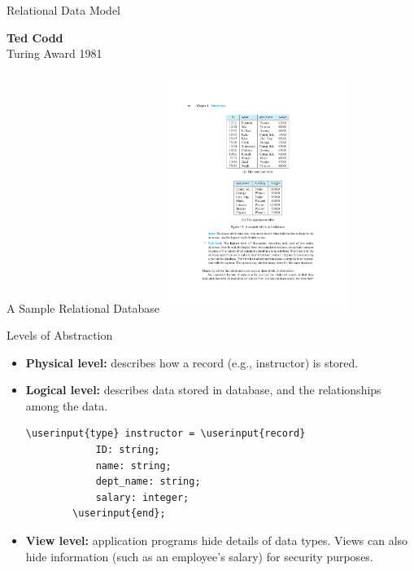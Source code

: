 \documentclass{beamer}
\newcommand\userinput[1]{\textbf{#1}}
\begin{document}
\begin{frame}{Relational Data Model}
\begin{minipage}{0.5\textwidth}
        \textbf{Ted Codd}\\
        Turing Award 1981
    \end{minipage}
\end{frame}

\begin{frame}{A Sample Relational Database}
    \centering 
    \includegraphics[width=0.45\textwidth, trim={7.25cm 5cm 6.75cm 4cm}, clip]{figures/db}
\end{frame}

\begin{frame}[fragile]{Levels of Abstraction}
    \begin{itemize}
        \item \textbf{Physical level:} describes how a record (e.g., instructor) is stored.
        \item \textbf{Logical level:} describes data stored in database, and the relationships among the data.
        \begin{Verbatim}[commandchars=\\\{\}]
        \userinput{type} instructor = \userinput{record} 
            ID: string;
            name: string;
            dept_name: string;
            salary: integer;
        \userinput{end};
        \end{Verbatim}
        \item \textbf{View level:} application programs hide details of data types.  Views can also hide information (such as an employee’s salary) for security purposes. 
    \end{itemize}
\end{frame}
\end{document}
